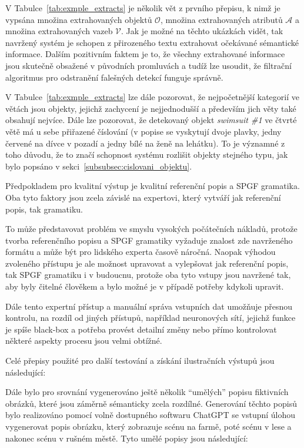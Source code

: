 V Tabulce~\ref{tab:exmple_extracts} je několik vět z prvního přepisu, k nimž je vypsána množina extrahovaných objektů $\mathcal{O}$,
množina extrahovaných atributů $\mathcal A$ a množina extrahovaných vazeb $\mathcal V$.
Jak je možné na těchto ukázkách vidět, tak navržený systém je schopen z přirozeného textu extrahovat očekávané sémantické informace.
Dalším pozitivním faktem je to, že všechny extrahované informace jsou skutečně obsažené v původních promluvách a tudíž lze usoudit, že filtrační
algoritmus pro odstranění falešných detekcí funguje správně.

V Tabulce~\ref{tab:exmple_extracts} lze dále pozorovat, že nejpočetnější kategorií ve větách jsou objekty, jejichž zachycení je nejjednodušší a především jich věty také obsahují nejvíce.
Dále lze pozorovat, že detekovaný objekt \emph{swimsuit \#1} ve čtvrté větě má u sebe přiřazené číslování (v popise se vyskytují dvoje plavky, jedny červené na dívce v pozadí
a jedny bílé na ženě na lehátku).
To je významné z toho důvodu, že to značí schopnost systému rozlišit objekty stejného typu, jak bylo popsáno v sekci~\ref{subsubsec:cislovani_objektu}.

Předpokladem pro kvalitní výstup je kvalitní referenční popis a SPGF gramatika.
Oba tyto faktory jsou zcela závislé na expertovi, který vytváří jak referenční popis, tak gramatiku.

To může představovat problém ve smyslu vysokých počátečních nákladů, protože tvorba referenčního popisu a SPGF gramatiky
vyžaduje znalost zde navrženého formátu a může být pro lidského experta časově náročná.
Naopak výhodou zvoleného přístupu je ale možnost upravovat a vylepšovat jak referenční popis, tak SPGF gramatiku i v budoucnu,
protože oba tyto vstupy jsou navržené tak, aby byly čitelné člověkem a bylo možné je v případě potřeby kdykoli upravit.

Dále tento expertní přístup a manuální správa vstupních dat umožňuje přesnou kontrolu, na rozdíl od jiných přístupů, například neuronových sítí, jejichž funkce je spíše black-box a
potřeba provést detailní změny nebo přímo kontrolovat některé aspekty procesu jsou velmi obtížné.

Celé přepisy použité pro další testování a získání ilustračních výstupů jsou následující:


Dále bylo pro srovnání vygenerováno ještě několik \enquote{umělých} popisu fiktivních obrázků,
které jsou záměrně sémanticky zcela rozdílné.
Generování těchto popisů bylo realizováno pomocí volně dostupného softwaru ChatGPT se vstupní úlohou
vygenerovat popis obrázku, který zobrazuje scénu na farmě, poté scénu v lese a nakonec scénu v rušném městě.
Tyto umělé popisy jsou následující:


